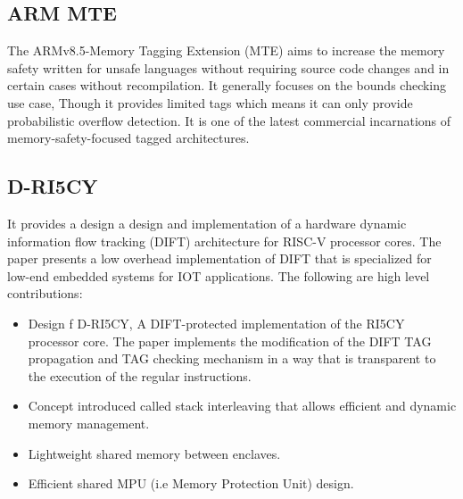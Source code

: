 	
\subsection{ARM MTE \cite{ARMMTE}}
The ARMv8.5-Memory Tagging Extension (MTE) aims to increase the memory safety written for 
unsafe languages without requiring source code changes and in certain cases without 
recompilation. It generally focuses on the bounds checking use case, Though it 
provides limited tags which means it can only provide probabilistic overflow detection. 
It is one of the latest commercial incarnations of memory-safety-focused tagged architectures.   

\subsection{D-RI5CY \cite{D-RISCY}}
It provides a design a design and implementation of a hardware dynamic information flow 
tracking (DIFT) architecture for RISC-V processor cores. The paper presents a low 
overhead implementation of DIFT that is specialized for low-end embedded systems
for IOT applications. The following are high level contributions:
\begin{itemize}
  \item Design f D-RI5CY, A DIFT-protected implementation of the RI5CY processor core. 
        The paper implements the modification of the DIFT TAG propagation and TAG checking
        mechanism in a way that is transparent to the execution of the regular instructions. 
  \item Concept introduced called stack interleaving that allows efficient and dynamic memory management.
  \item Lightweight shared memory between enclaves.
  \item Efficient shared MPU (i.e Memory Protection Unit) design.
\end{itemize}




